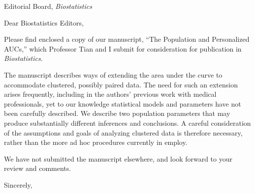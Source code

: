 \documentclass[10pt]{letter}
\begin{document}

\begin{letter}{Editorial Board, \emph{Biostatistics} } %


\opening{Dear Biostatistics Editors,}

Please find enclosed a copy of our manuscript, ``The Population and Personalized AUCs,'' which
Professor Tian and I submit
for consideration for publication in \emph{Biostatistics}.

The manuscript describes ways of extending the area under the curve to
accommodate clustered, possibly paired data. The need for such an
extension arises frequently, including in the authors' previous work with medical professionals,
yet to our knowledge statistical models and parameters have not been
carefully described. We describe two population parameters that may
produce substantially different inferences and conclusions. A careful
consideration of the assumptions and goals of analyzing clustered data
is therefore necessary, rather than the more ad hoc procedures
currently in employ. %

We have not submitted the manuscript elsewhere, and look forward to your review and
comments.

\vspace{2\parskip} %
\closing{Sincerely,}


\end{letter}
\end{document}
